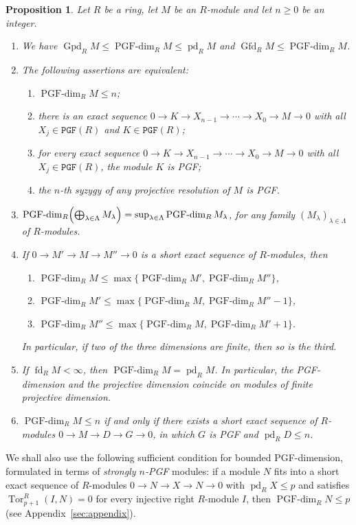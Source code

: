 \documentclass[12pt]{amsart}
\newtheorem{proposition}[theorem]{Proposition}
\theoremstyle{remark}
\theoremstyle{definition}
\theoremstyle{plain}
\DeclareMathOperator{\Gfd}{Gfd}
\DeclareMathOperator{\Gpd}{Gpd}
\DeclareMathOperator{\fd}{fd}
\DeclareMathOperator{\pd}{pd}
\DeclareMathOperator{\Tor}{Tor}
\newcommand{\PGFdim}{\operatorname{PGF\text{-}dim}}
\newcommand{\PGF}{\mathtt{PGF}}
\begin{document}
\begin{proposition}\label{prop2.3}
Let $R$ be a ring, let $M$ be an $R$-module and let $n\ge0$ be an integer.
\begin{enumerate}
\item[(i)]We have
$\Gpd_RM\le\PGFdim_RM\le\pd_RM$ and $\Gfd_RM\le\PGFdim_RM$.
\item[(ii)] The following assertions are equivalent:
\begin{enumerate}
\item[(a)] $\PGFdim_RM\le n$;
\item[(b)] there is an exact sequence $0\to K\to X_{n-1}\to\cdots\to X_0\to M\to0$ with all $X_j\in\PGF(R)$ and $K\in\PGF(R)$;
\item[(c)] for \emph{every} exact sequence $0\to K\to X_{n-1}\to\cdots\to X_0\to M\to0$ with all $X_j\in\PGF(R)$, the module $K$ is PGF;
\item[(d)] the $n$-th syzygy of any projective resolution of $M$ is PGF.
\end{enumerate}
\item[(iii)]
$\PGFdim_R\Bigl(\bigoplus_{\lambda\in\Lambda}M_\lambda\Bigr)=\sup_{\lambda\in\Lambda}\PGFdim_RM_\lambda$, for any family $(M_\lambda)_{\lambda\in\Lambda}$ of $R$-modules.
\item[(iv)]If $0\to M'\to M\to M''\to0$ is a short exact sequence of $R$-modules, then
\begin{enumerate}
\item[(a)]$\PGFdim_RM\le\max\{\PGFdim_RM',\PGFdim_RM''\}$,
\item[(b)]$\PGFdim_RM'\le\max\{\PGFdim_RM,\PGFdim_RM''-1\}$,
\item[(c)]$\PGFdim_RM''\le\max\{\PGFdim_RM,\PGFdim_RM'+1\}$.
\end{enumerate}
In particular, if two of the three dimensions are finite, then so is the third.
\item[(v)]If $\fd_RM<\infty$, then $\PGFdim_RM=\pd_RM$. In particular, the PGF-dimension and the projective dimension coincide on modules of finite projective dimension.
\item[(vi)] $\PGFdim_RM\le n$ if and only if there exists a short exact sequence of $R$-modules $0\rightarrow M\rightarrow D\rightarrow G\rightarrow0$, in which $G$ is PGF and $\pd_RD\le n$.
\end{enumerate}
\end{proposition}

We shall also use the following sufficient condition for bounded
PGF-dimension, formulated in terms of \emph{strongly $n$-PGF} modules: if a module $N$ fits into a short exact sequence of $R$-modules $0\to N\to X\to N\to0$ with $\pd_RX\le p$ and satisfies $\Tor^R_{p+1}(I,N)=0$ for every injective right $R$-module $I$, then $\PGFdim_RN\le p$ (see Appendix~\ref{sec:appendix}).
\end{document}
